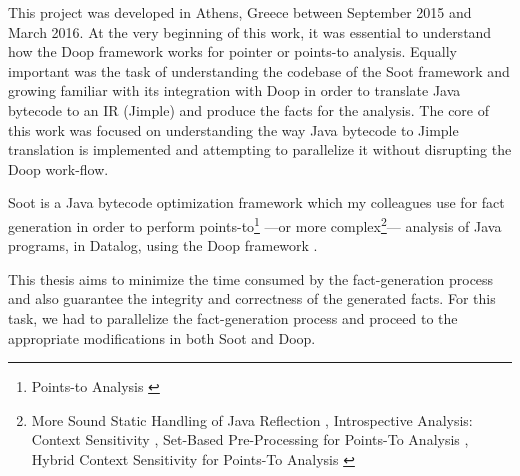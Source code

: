 \documentclass{dithesis}
\begin{document}
\tableofcontents
\listoffigures
\listoftables



\begin{thesisprologue}[Preface]
    This project was developed in Athens, Greece between September 2015 and March 2016. At the very beginning of this work, it was essential to understand how the Doop framework works for pointer or points-to analysis. Equally important was the task of understanding the codebase of the Soot framework and growing familiar with its integration with Doop in order to translate Java bytecode to an IR (Jimple) and produce the facts for the analysis. The core of this work was focused on understanding the way Java bytecode to Jimple translation is implemented and attempting to parallelize it without disrupting the Doop work-flow.
\end{thesisprologue}

\newcommand{\tab}[1]{\hspace{.2\textwidth}\rlap{#1}}

	Soot \cite{Sable: Soot} is a Java bytecode optimization framework which my colleagues use for fact generation in order to perform points-to\footnote{Points-to Analysis \cite{Points-to Analysis}} ---or more complex\footnote{More Sound Static Handling of Java Reflection \cite{More Sound Static Handling of Java Reflection}, Introspective Analysis: Context Sensitivity \cite{Introspective Analysis: Context Sensitivity}, Set-Based Pre-Processing for Points-To Analysis \cite{Set-Based Pre-Processing for Points-To Analysis}, Hybrid Context Sensitivity for Points-To Analysis \cite{Hybrid Context Sensitivity for Points-To Analysis}}--- analysis of Java programs, in Datalog, using the Doop framework \cite{Doop: Framework for Java Pointer Analysis}. 

	This thesis aims to minimize the time consumed by the fact-generation process and also guarantee the integrity and correctness of the generated facts. For this task, we had to parallelize the fact-generation process and proceed to the appropriate modifications in both Soot and Doop.
\end{document}
